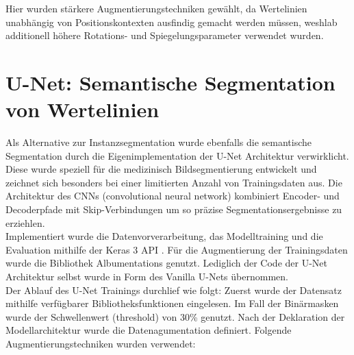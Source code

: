 Hier wurden stärkere Augmentierungstechniken gewählt, da Wertelinien unabhängig von Positionskontexten ausfindig gemacht werden müssen, weshlab additionell höhere Rotations- und Spiegelungsparameter verwendet wurden.


\section{U-Net: Semantische Segmentation von Wertelinien}

Als Alternative zur Instanzsegmentation wurde ebenfalls die semantische Segmentation durch die Eigenimplementation der U-Net Architektur verwirklicht. Diese wurde speziell für die medizinisch Bildsegmentierung entwickelt und zeichnet sich besonders bei einer limitierten Anzahl von Trainingsdaten aus. Die Architektur des CNNs (convolutional neural network) kombiniert Encoder- und Decoderpfade mit Skip-Verbindungen um so präzise Segmentationsergebnisse zu erziehlen.
\\
Implementiert wurde die Datenvorverarbeitung, das Modelltraining und die Evaluation mithilfe der Keras 3 API \cite{chollet2015keras}. Für die Augmentierung der Trainingsdaten wurde die Bibliothek Albumentations \cite{info11020125} genutzt. Lediglich der Code der U-Net Architektur selbst wurde in Form des Vanilla U-Nets \cite{zak2024kerasunet} übernommen.
\\
Der Ablauf des U-Net Trainings durchlief wie folgt:
Zuerst wurde der Datensatz mithilfe verfügbarer Bibliotheksfunktionen eingelesen. Im Fall der Binärmasken wurde der Schwellenwert (threshold) von 30\% genutzt. Nach der Deklaration der Modellarchitektur wurde die Datenagumentation definiert. Folgende Augmentierungstechniken wurden verwendet:

